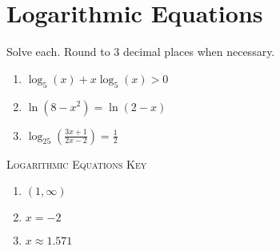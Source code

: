 \chapter{Logarithmic Equations}

Solve each. Round to 3 decimal places when necessary.
\begin{enumerate}
	\item $\log_5(x) + x\log_5(x) > 0$
	\item $\ln\left(8-x^2\right) = \ln(2-x)$
	\item $\log_{25}\left(\frac{3x+1}{2x-2}\right) = \frac{1}{2}$
\end{enumerate}

\newpage

\textsc{Logarithmic Equations Key}

\begin{enumerate}
	\item $(1, \infty)$
	\item $x = -2$
	\item $x \approx 1.571$
\end{enumerate}